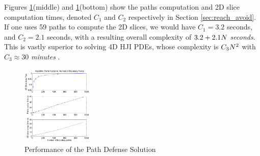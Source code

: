 Figures \ref{fig:alg_perf_1}(middle) and \ref{fig:alg_perf_1}(bottom) show the paths computation and 2D slice computation times, denoted $C_1$ and $C_2$ respectively in Section \ref{sec:reach_avoid}. If one uses 59 paths to compute the 2D slices, we would have $C_1=3.2$ seconds, and $C_2=2.1$ seconds, with a resulting overall complexity of $3.2 + 2.1 N$ \textit{seconds}. This is vastly superior to solving 4D HJI PDEs, whose complexity is $C_3N^2$ with $C_3\approx30$ \textit{minutes} \cite{Chen2014}.

\begin{figure}[H]
	\centering
	\includegraphics[width=0.3\textwidth]{"fig/alg_perf_1"}
	\caption{Performance of the Path Defense Solution}
	\label{fig:alg_perf_1}
\end{figure}
